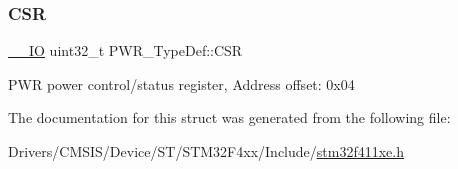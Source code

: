 \subsubsection{\texorpdfstring{C\+SR}{CSR}}
{\footnotesize\ttfamily \hyperlink{core__sc300_8h_aec43007d9998a0a0e01faede4133d6be}{\+\_\+\+\_\+\+IO} uint32\+\_\+t P\+W\+R\+\_\+\+Type\+Def\+::\+C\+SR}

P\+WR power control/status register, Address offset\+: 0x04 

The documentation for this struct was generated from the following file\+:\begin{DoxyCompactItemize}
\item 
Drivers/\+C\+M\+S\+I\+S/\+Device/\+S\+T/\+S\+T\+M32\+F4xx/\+Include/\hyperlink{stm32f411xe_8h}{stm32f411xe.\+h}\end{DoxyCompactItemize}

